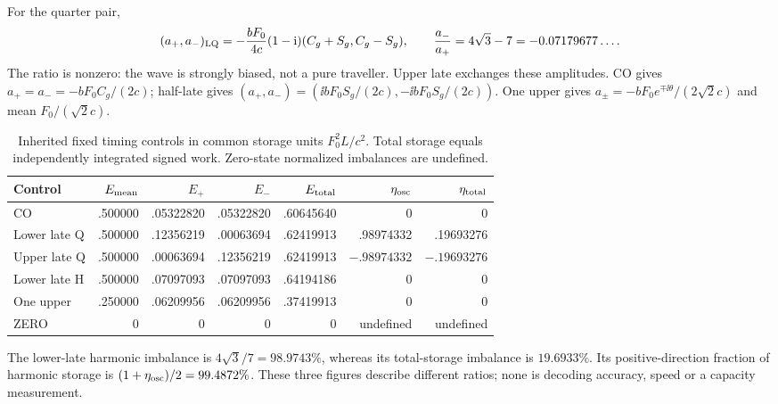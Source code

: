 For the quarter pair,
\begin{equation}\label{eq:quarter}
 (a_+,a_-)_{\rm LQ}=-\frac{bF_0}{4c}(1-\mathrm i)(C_g+S_g,C_g-S_g),
 \qquad \frac{a_-}{a_+}=4\sqrt3-7=-0.07179677\ldots .
\end{equation}
The ratio is nonzero: the wave is strongly biased, not a pure traveller. Upper late exchanges these amplitudes. CO gives $a_+=a_-=-bF_0C_g/(2c)$; half-late gives $(a_+,a_-)=(\ii bF_0S_g/(2c),-\ii bF_0S_g/(2c))$. One upper gives $a_\pm=-bF_0e^{\mp\ii\theta}/(2\sqrt2c)$ and mean $F_0/(\sqrt2c)$.

\begin{table}[htbp]\centering\small
\begin{tabular}{lrrrrrr}\toprule
Control & $E_{\rm mean}$ & $E_+$ & $E_-$ & $E_{\rm total}$ & $\eta_{\rm osc}$ & $\eta_{\rm total}$\\\midrule
CO &.500000&.05322820&.05322820&.60645640&0&0\\
Lower late Q &.500000&.12356219&.00063694&.62419913&.98974332&.19693276\\
Upper late Q &.500000&.00063694&.12356219&.62419913&$-.98974332$&$-.19693276$\\
Lower late H &.500000&.07097093&.07097093&.64194186&0&0\\
One upper &.250000&.06209956&.06209956&.37419913&0&0\\
ZERO &0&0&0&0&undefined&undefined\\\bottomrule
\end{tabular}
\caption{Inherited fixed timing controls in common storage units $F_0^2L/c^2$. Total storage equals independently integrated signed work. Zero-state normalized imbalances are undefined.}\label{tab:timing}
\end{table}

The lower-late harmonic imbalance is $4\sqrt3/7=98.9743\%$, whereas its total-storage imbalance is $19.6933\%$. Its positive-direction fraction of harmonic storage is $(1+\eta_{\rm osc})/2=99.4872\%$. These three figures describe different ratios; none is decoding accuracy, speed or a capacity measurement.

